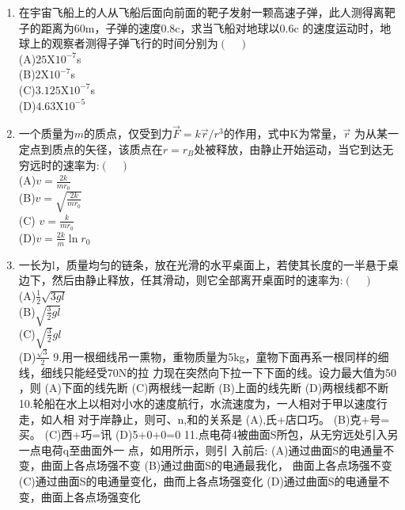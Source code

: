 \begin{enumerate}
(A)$0.995c,4.488 MeV,2.66*10^{41}kg.m.s^{-1}$
(B)$0.995c,0.512 MeV,2.66*10^{41}kg.m.s^{-1}$
(C)$0.995c,8.96*10^{-15},2.66*10^{32}kg.m.s^{-1}$
(D)$0.995c,8.96*10^{-15},2.72*10^{28}kg.m.s^{-1}$
\item 在宇宙飞船上的人从飞船后面向前面的靶子发射一颗高速子弹，此人测得离靶子的距离为60m，子弹的速度0.8c，求当飞船对地球以0.6c 的速度运动时，地球上的观察者测得子弹飞行的时间分别为$(\quad)$\\
(A)$25$X$10^{-7}$s\\
(B)$2$X$10^{-7}$s\\
(C)$3.125$X$10^{-7}$s\\
(D)$4.63$X$10^{-5}$
\item 一个质量为$m$的质点，仅受到力$\vec F=k\vec r/r^3$的作用，式中K为常量，$\vec r$ 为从某一定点到质点的矢径，该质点在$r=r_B$处被释放，由静止开始运动，当它到达无穷远时的速率为:$(\quad)$\\
(A)$\displaystyle v=\frac{2k}{mr_0}$\\
(B)$\displaystyle v=\sqrt{\frac{2k}{mr_0}}$\\
(C) $\displaystyle v=\frac{k}{mr_0}$\\
(D)$\displaystyle v=\frac{2k}{m}\ln r_0$

\item 一长为l，质量均匀的链条，放在光滑的水平桌面上，若使其长度的一半悬于桌边下，然后由静止释放，任其滑动，则它全部离开桌面时的速率为:$(\quad)$\\
(A)$\frac{1}{2}\sqrt{3gl}$\\
(B)$\sqrt{\frac{3}{2}gl}$\\
(C)$\sqrt{\frac{3}{2}}gl$\\
(D)$\frac{\sqrt{3}}{2}$
9.用一根细线吊一熏物，重物质量为5kg，童物下面再系一根同样的细线，细线只能经受70N的拉
力现在突然向下拉一下下面的线。设力最大值为50 ，则
(A)下面的线先断
(C)两根线一起断
(B)上面的线先断
(D)两根线都不断
10.轮船在水上以相对小水的速度航行，水流速度为，一人相对于甲以速度行走，如人相
对于岸静止，则可、n,和的关系是
(A),氏+店口巧。
(B)克+号=买。
(C)西+巧=讯
(D)5+0+0=0
11.点电荷4被曲面S所包，从无穷远处引入另一点电荷q至曲面外一 点，如用所示，则引
入前后:
(A)通过曲面S的电通量不变，曲面上各点场强不变
(B)通过曲面S的电通最我化，
曲面上各点场强不变
(C)通过曲面S的电通量变化，曲而上各点场强变化
(D)通过曲面S的电通量不变，曲面上各点场强变化
\end{enumerate}
